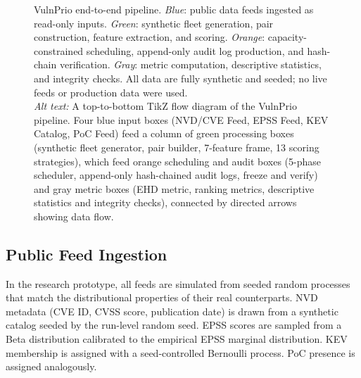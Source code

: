 \documentclass[journal]{IEEEtran}
\begin{document}
\begin{figure}[t]
{%
}%
\caption{VulnPrio end-to-end pipeline.
  \textit{Blue}: public data feeds ingested as read-only inputs.
  \textit{Green}: synthetic fleet generation, pair construction,
  feature extraction, and scoring.
  \textit{Orange}: capacity-constrained scheduling, append-only
  audit log production, and hash-chain verification.
  \textit{Gray}: metric computation, descriptive statistics, and
  integrity checks.
  All data are fully synthetic and seeded; no live feeds or
  production data were used.\\[2pt]\textit{Alt text:} A top-to-bottom
  TikZ flow diagram of the VulnPrio pipeline. Four blue input boxes
  (NVD/CVE Feed, EPSS Feed, KEV Catalog, PoC Feed) feed a column of
  green processing boxes (synthetic fleet generator, pair builder,
  7-feature frame, 13 scoring strategies), which feed orange scheduling
  and audit boxes (5-phase scheduler, append-only hash-chained audit
  logs, freeze and verify) and gray metric boxes (EHD metric, ranking
  metrics, descriptive statistics and integrity checks), connected by
  directed arrows showing data flow.}
\label{fig:pipeline}
\end{figure}

\subsection{Public Feed Ingestion}

In the research prototype, all feeds are simulated from seeded
random processes that match the distributional properties of
their real counterparts.  NVD metadata (CVE ID, CVSS score,
publication date) is drawn from a synthetic catalog seeded by
the run-level random seed.  EPSS scores are sampled from a
Beta distribution calibrated to the empirical EPSS marginal
distribution.  KEV membership is assigned with a seed-controlled
Bernoulli process.  PoC presence is assigned analogously.
\end{document}

